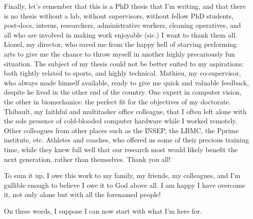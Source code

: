 Finally, let's remember that this is a PhD thesis that I'm writing, and that there is no thesis without a lab, without supervisors, without fellow PhD students, post-docs, interns, researchers, administrative workers, cleaning operatives, and all who are involved in making work enjoyable (sic.) I want to thank them all. Lionel, my director, who saved me from the happy hell of starving performing arts to give me the chance to throw myself in another highly precariously fun situation. The subject of my thesis could not be better suited to my aspirations: both tightly related to sports, and highly technical. Mathieu, my co-supervisor, who always made himself available, ready to give me quick and valuable feedback, despite he lived in the other end of the country. One expert in computer vision, the other in biomechanics: the perfect fit for the objectives of my doctorate. Thibault, my faithful and multitasker office colleague, that I often left alone with the sole presence of cold-blooded computer hardware while I worked remotely. Other colleagues from other places such as the INSEP, the LBMC, the Pprime institute, etc. Athletes and coaches, who offered us some of their precious training time, while they knew full well that our research most would likely benefit the next generation, rather than themselves. Thank you all!

To sum it up, I owe this work to my family, my friends, my colleagues, and I'm gullible enough to believe I owe it to God above all. I am happy I have overcome it, not only alone but with all the forenamed people!

On these words, I suppose I can now start with what I'm here for.